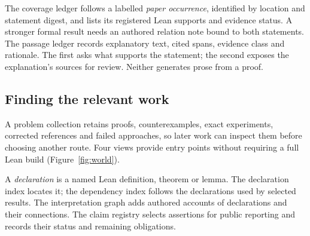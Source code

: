 \documentclass[10pt]{article}
\begin{document}
The coverage ledger follows a labelled \emph{paper occurrence}, identified by location and statement digest, and lists its registered Lean supports and evidence status. A stronger formal result needs an authored relation note bound to both statements. The passage ledger records explanatory text, cited spans, evidence class and rationale. The first asks what supports the statement; the second exposes the explanation's sources for review. Neither generates prose from a proof.

\subsection{Finding the relevant work}
A problem collection retains proofs, counterexamples, exact experiments, corrected references and failed approaches, so later work can inspect them before choosing another route.
Four views provide entry points without requiring a full Lean build (Figure~\ref{fig:world}).

A \emph{declaration} is a named Lean definition, theorem or lemma. The declaration index locates it; the dependency index follows the declarations used by selected results.
The interpretation graph adds authored accounts of declarations and their connections. The claim registry selects assertions for public reporting and records their status and remaining obligations.
\end{document}
